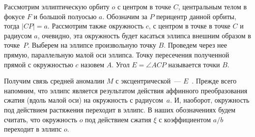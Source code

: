 Рассмотрим эллиптическую орбиту $o$ с центром в точке $C$, центральным телом в фокусе $F$ и большой полуосью $a$. Обозначим за $P$ перицентр данной орбиты, тогда $|CP| = a$. Рассмотрим также окружность $c$, с центром в точке в точке $C$ и радиусом $a$, очевидно, эта окружность будет касаться эллипса внешним образом в точке~$P$. Выберем на эллипсе произвольную точку $B$. Проведем через нее прямую, параллельную малой оси эллипса. Точку пересечения полученной прямой с окружностью $c$ назовем $A$. Угол $E = \angle ACP$ называется  точки $B$.


Получим связь средней аномалии $M$ с эксцентрической~--- $E$~\cite{orbital-motion-roy}. Прежде всего напомним, что эллипс является результатом действия аффинного преобразования сжатия (вдоль малой оси) на окружность с радиусом~$a$. И, наоборот, окружность под действием растяжения переходит в эллипс. В наших обозначениях будем считать, что окружность $o$ под действием сжатия $\xi$ с коэффициентом $a/b$ переходит в эллипс $o$.

